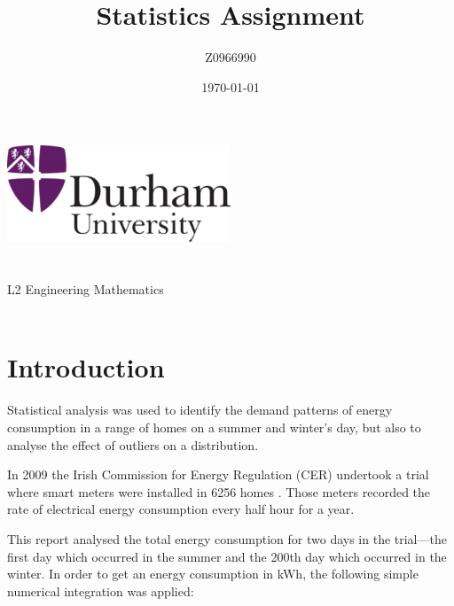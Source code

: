\documentclass[a4paper,10pt,twocolumn]{article}
\author{Z0966990}
\title{Statistics Assignment}
\date{\today}
\begin{document}
    
\begin{titlepage}
    \centering
    \vspace*{\fill}
    \includegraphics[width=0.5\textwidth]{Durham}\\
    \vspace*{\fill}
    \LARGE\thetitle\\
    \large\theauthor\\
    \large L2 Engineering Mathematics\\
    \large\thedate\\
    \vspace*{\fill}
\end{titlepage}


\printnomenclature

\section{Introduction}

Statistical analysis was used to identify the demand patterns of energy 
consumption in a range of homes on a summer and winter's day, but also to 
analyse the effect of outliers on a distribution.

In 2009 the Irish Commission for Energy Regulation (CER) undertook a trial 
where smart meters were installed in 6256 homes \cite{martinsmart}. Those 
meters recorded the rate of electrical energy consumption every half hour for a 
year.

This report analysed the total energy consumption for two days in the 
trial---the first day which occurred in the summer and the 200th day which 
occurred in the winter. In order to get an energy consumption in kWh, the  
following simple numerical integration was applied:
\end{document}
